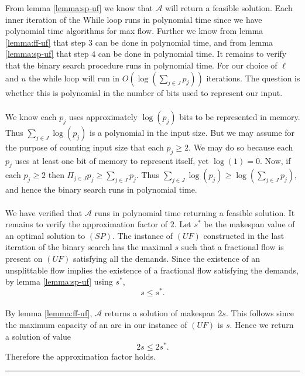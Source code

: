 \documentclass[letterpaper,12pt,oneside,onecolumn]{article}
\newcommand{\cA}{\mathcal{A}} \newcommand{\cB}{\mathcal{B}}
\newenvironment{proof}{{\bf Proof:  }}{\hfill\rule{2mm}{2mm}}
\begin{document}
\begin{proof}
From lemma \ref{lemma:sp-uf} we know that $\cA$ will return a feasible solution. Each inner iteration of the While loop runs in polynomial time since we have polynomial time algorithms for max flow. Further we know from lemma \ref{lemma:ff-uf} that step $3$ can be done in polynomial time, and from lemma \ref{lemma:sp-uf} that step $4$ can be done in polynomial time. It remains to verify that the binary search procedure runs in polynomial time. For our choice of $\ell$ and $u$ the while loop will run in $O(\log(\sum_{j \in J} p_j))$ iterations. The question is whether this is polynomial in the number of bits used to represent our input.
\paragraph{}
We know each $p_j$ uses approximately $\log(p_j)$ bits to be represented in memory. Thus $\sum_{j \in J} \log(p_j)$ is a polynomial in the input size. But we may assume for the purpose of counting input size that each $p_j \geq 2$. We may do so because each $p_j$ uses at least one bit of memory to represent itself, yet $\log(1) = 0$. Now, if each $p_j \geq 2$ then $\Pi_{j\in J} p_j \geq \sum_{j \in J} p_j$. Thus $\sum_{j \in J} \log(p_j) \geq \log(\sum_{j \in J} p_j)$, and hence the binary search runs in polynomial time.
\paragraph{}
We have verified that $\cA$ runs in polynomial time returning a feasible solution. It remains to verify the approximation factor of $2$. Let $s^*$ be the makespan value of an optimal solution to $(SP)$. The instance of $(UF)$ constructed in the last iteration of the binary search has the maximal $s$ such that a fractional flow is present on $(UF)$ satisfying all the demands. Since the existence of an unsplittable flow implies the existence of a fractional flow satisfying the demands, by lemma \ref{lemma:sp-uf} using $s^*$, $$s \leq s^*.$$
\paragraph{}
By lemma \ref{lemma:ff-uf}, $\cA$ returns a solution of makespan $2s$. This follows since the maximum capacity of an arc in our instance of $(UF)$ is $s$. Hence we return a solution of value
$$2s \leq 2s^*.$$
Therefore the approximation factor holds.
\end{proof}
\section{}

\section{}
\end{document}
